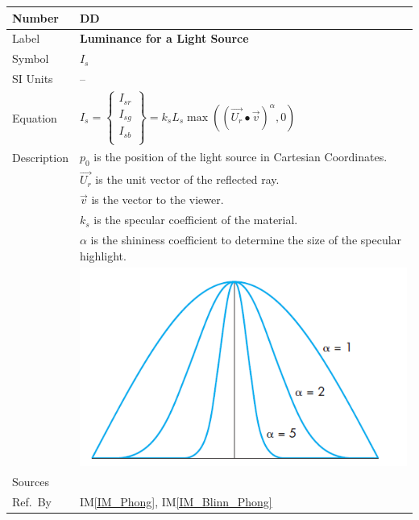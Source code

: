 \documentclass[12pt]{article}
\newcommand{\colAwidth}{0.13\textwidth}
\newcommand{\colBwidth}{0.82\textwidth}
\newcounter{defnum} %
\newcounter{datadefnum} %
\newcommand{\iref}[1]{IM\ref{#1}}
\begin{document}
\noindent
\begin{minipage}{\textwidth}
	\renewcommand*{\arraystretch}{1.5}
	\begin{tabular}{| p{\colAwidth} | p{\colBwidth}|}
		\hline
		\rowcolor[gray]{0.9}
		Number& DD{datadefnum}\thedatadefnum 
		\label{DD_Intensity_specular}\\
		\hline
		Label& \bf Luminance for a Light Source\\
		\hline
		Symbol &$I_{s}$\\
		\hline
		SI Units & --\\
		\hline
		Equation&$I_{s} = \begin{Bmatrix}
		I_{sr} \\ I_{sg} \\ I_{sb} \\
		\end{Bmatrix} = k_{s}L_{s}\max((\vec{U_{r}}\bullet \vec{v})^\alpha, 0)
		$ \\
		\hline
		Description & $p_{0}$ is the position of the light source in Cartesian 
		Coordinates.
		\\
		& $\vec{U_{r}}$ is the unit vector of the reflected ray.\\
		& $\vec{v}$ is the vector to the viewer.\\
		& $k_{s}$ is the specular coefficient of the material.\\
		& $\alpha$ is the shininess coefficient to determine the size of the 
		specular highlight.\\
		& \includegraphics[]{./images/shininess-coefficient}\\
		\hline
		Sources& \cite{shreiner2012}\\
		\hline
		Ref.\ By & \iref{IM_Phong}, \iref{IM_Blinn_Phong}\\
		\hline
	\end{tabular}
\end{minipage}\\
\end{document}
